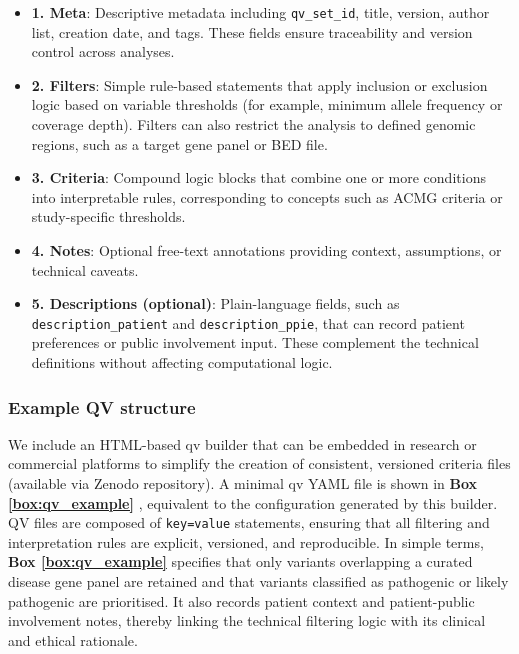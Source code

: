 \documentclass[unnumsec,webpdf,contemporary,large,namedate]{oup-authoring-template}
\begin{document}
\begin{itemize}
    \item \textbf{1. Meta}: Descriptive metadata including \texttt{qv\_set\_id}, title, version, author list, creation date, and tags. These fields ensure traceability and version control across analyses.
    \item \textbf{2. Filters}: Simple rule-based statements that apply inclusion or exclusion logic based on variable thresholds (for example, minimum allele frequency or coverage depth). Filters can also restrict the analysis to defined genomic regions, such as a target gene panel or BED file.
    \item \textbf{3. Criteria}: Compound logic blocks that combine one or more conditions into interpretable rules, corresponding to concepts such as ACMG criteria or study-specific thresholds.
    \item \textbf{4. Notes}: Optional free-text annotations providing context, assumptions, or technical caveats.
    \item \textbf{5. Descriptions (optional)}: Plain-language fields, such as \texttt{description\_patient} and \texttt{description\_ppie}, that can record patient preferences or public involvement input. These complement the technical definitions without affecting computational logic.
\end{itemize}

\subsubsection*{Example QV structure}
We include an HTML-based \ac{qv} builder that can be embedded in research or commercial platforms to simplify the creation of consistent, versioned criteria files (available via Zenodo repository).   
A minimal \ac{qv} YAML file is shown in \textbf{Box \ref{box:qv_example}} , equivalent to the configuration generated by this builder.
QV files are composed of \texttt{key=value} statements, ensuring that all filtering and interpretation rules are explicit, versioned, and reproducible.
In simple terms, \textbf{Box \ref{box:qv_example}} specifies that only variants overlapping a curated disease gene panel are retained and that variants classified as pathogenic or likely pathogenic are prioritised.  
It also records patient context and patient-public involvement notes, thereby linking the technical filtering logic with its clinical and ethical rationale.\\
\end{document}
